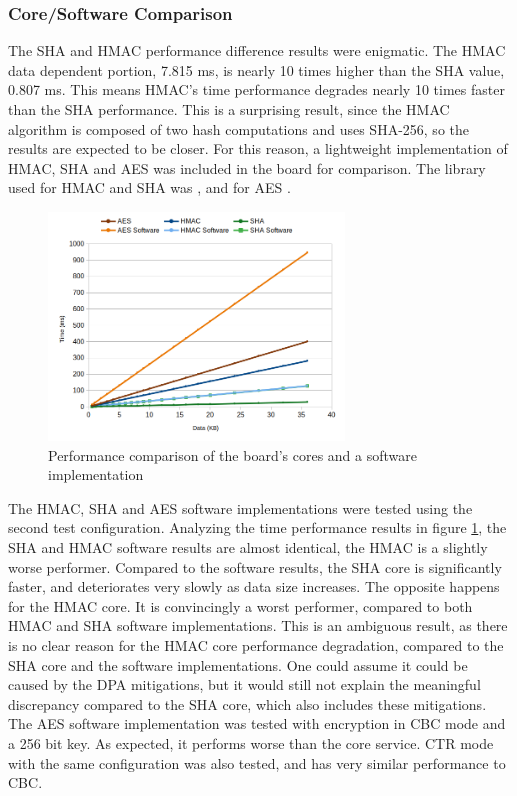 \subsubsection{Core/Software Comparison}\label{chap:evaluation:services:software}

The SHA and HMAC performance difference results were enigmatic. The HMAC data dependent portion, 7.815 ms, is nearly 10 times higher than the SHA value, 0.807 ms. This means HMAC's time performance degrades nearly 10 times faster than the SHA performance. This is a surprising result, since the HMAC algorithm is composed of two hash computations and uses SHA-256, so the results are expected to be closer.
For this reason, a lightweight implementation of HMAC, SHA and AES was included in the board for comparison. The library used for HMAC and SHA was \cite{ogayHMAC}, and for AES \cite{tinycrypt}. 

\begin{figure}[h!]
	\centering
	\includegraphics[width=0.7\textwidth]{./Images/software-core-time.png}
	\caption{Performance comparison of the board's cores and a software implementation}
	\label{fig:performance:software-core-time}
\end{figure}

The HMAC, SHA and AES software implementations were tested using the second test configuration.
Analyzing the time performance results in figure \ref{fig:performance:software-core-time}, the SHA and HMAC software results are almost identical, the HMAC is a slightly worse performer. Compared to the software results, the SHA core is significantly faster, and deteriorates very slowly as data size increases. The opposite happens for the HMAC core. It is convincingly a worst performer, compared to both HMAC and SHA software implementations. 
This is an ambiguous result, as there is no clear reason for the HMAC core performance degradation, compared to the SHA core and the software implementations. One could assume it could be caused by the DPA mitigations, but it would still not explain the meaningful discrepancy compared to the SHA core, which also includes these mitigations.
The AES software implementation was tested with encryption in CBC mode and a 256 bit key. As expected, it performs worse than the core service. CTR mode with the same configuration was also tested, and has very similar performance to CBC.

